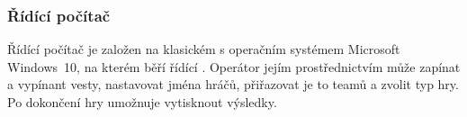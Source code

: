 \subsubsection{Řídící počítač}
Řídící počítač je založen na klasickém  s operačním systémem Microsoft Windows~10, na kterém běří řídící . Operátor jejím prostřednictvím může zapínat a vypínant vesty, nastavovat jména hráčů, přiřazovat je to teamů a zvolit typ hry. Po dokončení hry umožnuje  vytisknout výsledky.
